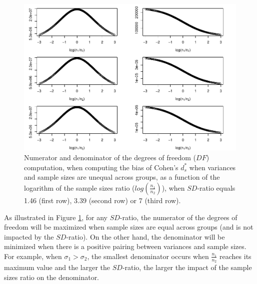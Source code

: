 \documentclass[
  english,
  man]{apa6}
\begin{document}
\begin{figure}
\centering
\includegraphics{Theoretical-Bias-of-all-estimators-as-a-function-of-population-parameters_files/figure-latex/dfnumdenomcohendprimehetunbalnratiosdratio2-1.pdf}
\caption{\label{fig:dfnumdenomcohendprimehetunbalnratiosdratio2}Numerator and denominator of the degrees of freedom (\(DF\)) computation, when computing the bias of Cohen's \(d^*_s\) when variances and sample sizes are unequal across groups, as a function of the logarithm of the sample sizes ratio (\(log \left( \frac{n_1}{n_2} \right)\)), when \(SD\)-ratio equals 1.46 (first row), 3.39 (second row) or 7 (third row).}
\end{figure}

As illustrated in Figure \ref{fig:dfnumdenomcohendprimehetunbalnratiosdratio2}, for any \(SD\)-ratio, the numerator of the degrees of freedom will be maximized when sample sizes are equal across groups (and is not impacted by the \(SD\)-ratio). On the other hand, the denominator will be minimized when there is a positive pairing between variances and sample sizes. For example, when \(\sigma_1 > \sigma_2\), the smallest denominator occurs when \(\frac{n_1}{n_2}\) reaches its maximum value and the larger the \(SD\)-ratio, the larger the impact of the sample sizes ratio on the denominator.
\end{document}
